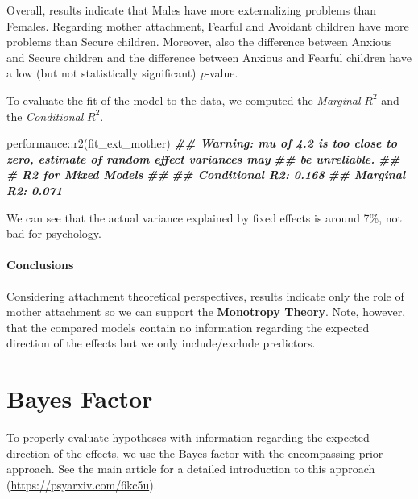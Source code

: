 \documentclass[
]{book}
\newenvironment{Shaded}{\begin{snugshade}}{\end{snugshade}}
\newcommand{\DocumentationTok}[1]{\textcolor[rgb]{0.56,0.35,0.01}{\textbf{\textit{#1}}}}
\newcommand{\FunctionTok}[1]{\textcolor[rgb]{0.00,0.00,0.00}{#1}}
\newcommand{\NormalTok}[1]{#1}
\newcommand{\SpecialCharTok}[1]{\textcolor[rgb]{0.00,0.00,0.00}{#1}}
\begin{document}
Overall, results indicate that Males have more externalizing problems than Females. Regarding mother attachment, Fearful and Avoidant children have more problems than Secure children. Moreover, also the difference between Anxious and Secure children and the difference between Anxious and Fearful children have a low (but not statistically significant) \emph{p}-value.

To evaluate the fit of the model to the data, we computed the \emph{Marginal} \(R^2\) and the \emph{Conditional} \(R^2\).

\begin{Shaded}
\begin{Highlighting}[]
\NormalTok{performance}\SpecialCharTok{::}\FunctionTok{r2}\NormalTok{(fit\_ext\_mother)}
\DocumentationTok{\#\# Warning: mu of 4.2 is too close to zero, estimate of random effect variances may}
\DocumentationTok{\#\#   be unreliable.}
\DocumentationTok{\#\# \# R2 for Mixed Models}
\DocumentationTok{\#\# }
\DocumentationTok{\#\#   Conditional R2: 0.168}
\DocumentationTok{\#\#      Marginal R2: 0.071}
\end{Highlighting}
\end{Shaded}

We can see that the actual variance explained by fixed effects is around 7\%, not bad for psychology.

\hypertarget{conclusions-1}{%
\subsubsection*{Conclusions}\label{conclusions-1}}

Considering attachment theoretical perspectives, results indicate only the role of mother attachment so we can support the \textbf{Monotropy Theory}. Note, however, that the compared models contain no information regarding the expected direction of the effects but we only include/exclude predictors.

\hypertarget{BF-ext}{%
\chapter{Bayes Factor}\label{BF-ext}}

To properly evaluate hypotheses with information regarding the expected direction of the effects, we use the Bayes factor with the encompassing prior approach. See the main article for a detailed introduction to this approach (\url{https://psyarxiv.com/6kc5u}).
\end{document}

